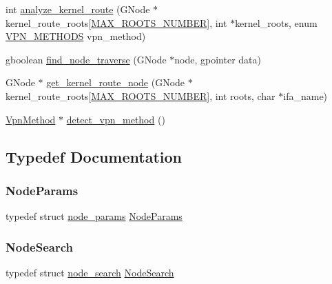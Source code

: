 \begin{DoxyCompactItemize}
\item 
int \hyperlink{route-tree_8c_a5a490e2e29be18ae630572e3776539af}{analyze\+\_\+kernel\+\_\+route} (G\+Node $\ast$kernel\+\_\+route\+\_\+roots\mbox{[}\hyperlink{route-tree_8h_a8e1da3af3417de420798c8b448b6a8cb}{M\+A\+X\+\_\+\+R\+O\+O\+T\+S\+\_\+\+N\+U\+M\+B\+ER}\mbox{]}, int $\ast$kernel\+\_\+roots, enum \hyperlink{route-tree_8h_a5b876670828c4e38106ba1c6d91024b7}{V\+P\+N\+\_\+\+M\+E\+T\+H\+O\+DS} vpn\+\_\+method)
\item 
gboolean \hyperlink{route-tree_8c_a3a0eeaa4d6b227ed8aa19e5d56096cd3}{find\+\_\+node\+\_\+traverse} (G\+Node $\ast$node, gpointer data)
\item 
G\+Node $\ast$ \hyperlink{route-tree_8c_a77affcaa875961893c05c7e211678ed1}{get\+\_\+kernel\+\_\+route\+\_\+node} (G\+Node $\ast$kernel\+\_\+route\+\_\+roots\mbox{[}\hyperlink{route-tree_8h_a8e1da3af3417de420798c8b448b6a8cb}{M\+A\+X\+\_\+\+R\+O\+O\+T\+S\+\_\+\+N\+U\+M\+B\+ER}\mbox{]}, int roots, char $\ast$ifa\+\_\+name)
\item 
\hyperlink{route-tree_8h_a1034dd038389279bf422489d4d99d43a}{Vpn\+Method} $\ast$ \hyperlink{route-tree_8c_a267529614de44218b8187f3ac46ce46f}{detect\+\_\+vpn\+\_\+method} ()
\end{DoxyCompactItemize}


\subsection{Typedef Documentation}
\mbox{\label{route-tree_8c_a3aa763b62cd1d285ed35bb7f0fe4d149}} 
\subsubsection{\texorpdfstring{Node\+Params}{NodeParams}}
{\footnotesize\ttfamily typedef struct \hyperlink{structnode__params}{node\+\_\+params}  \hyperlink{route-tree_8c_a3aa763b62cd1d285ed35bb7f0fe4d149}{Node\+Params}}

\mbox{\label{route-tree_8c_a26d9b840f9226a0ce349b00950ea0bdc}} 
\subsubsection{\texorpdfstring{Node\+Search}{NodeSearch}}
{\footnotesize\ttfamily typedef struct \hyperlink{structnode__search}{node\+\_\+search}  \hyperlink{route-tree_8c_a26d9b840f9226a0ce349b00950ea0bdc}{Node\+Search}}



